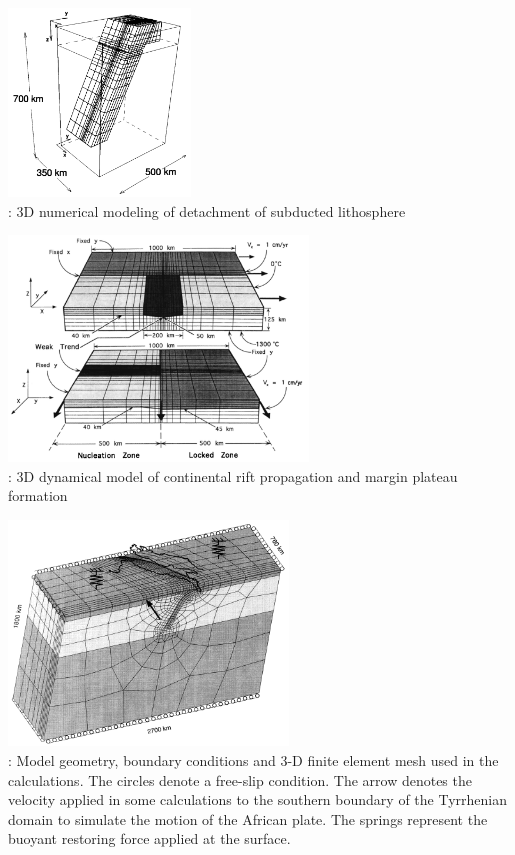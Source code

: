 \begin{center}
\begin{minipage}{0.45\textwidth}
\centering
\includegraphics[height=5cm]{images/history/yowo95}\\
{: 3D numerical modeling of detachment of subducted 
lithosphere \cite{yowo95}}
\end{minipage}\hfill
\begin{minipage}{0.45\textwidth}
\centering
\includegraphics[height=6cm]{images/history/dusa96}\\
{: 3D dynamical model of continental rift propagation and 
margin plateau formation \cite{dusa96}}
\end{minipage}
\end{center}



\begin{center}
\includegraphics[height=6cm]{images/history/nesb99}\\
{: Model geometry, boundary conditions and 3-D finite element mesh used in 
the calculations. The circles denote a free-slip condition. The arrow denotes the velocity 
applied in some calculations to the southern boundary of the Tyrrhenian domain to simulate 
the motion of the African plate. The springs represent the buoyant restoring force applied 
at the surface. \cite{nesb99}}
\end{center}


